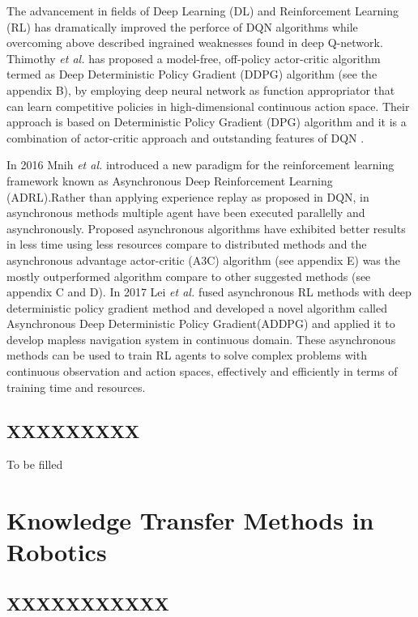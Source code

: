 \documentclass[a4paper,oneside,12pt]{report}
\begin{document}
The advancement in fields of Deep Learning (DL) and Reinforcement Learning (RL) has dramatically improved the perforce of DQN algorithms while overcoming above described ingrained weaknesses found in deep Q-network. Thimothy \textit{et al.} \cite{R06} has proposed a model-free, off-policy actor-critic algorithm termed as Deep Deterministic Policy Gradient (DDPG) algorithm (see the appendix B), by employing deep neural network as function appropriator that can learn competitive policies in high-dimensional continuous action space. Their approach is based on Deterministic Policy Gradient (DPG) algorithm \cite{R14} and it is a combination of actor-critic approach\cite{R55} and outstanding features of DQN \cite{R04} \cite{R06}. 

In 2016 Mnih \textit{et al.} introduced a new paradigm for the reinforcement learning framework known as Asynchronous Deep Reinforcement Learning (ADRL)\cite{R20}.Rather than applying experience replay as proposed in DQN, in asynchronous methods multiple agent have been executed parallelly and asynchronously. Proposed asynchronous algorithms have exhibited better results in less time using less resources compare to distributed methods \cite{R56} and the asynchronous advantage actor-critic (A3C) algorithm (see appendix E) was the mostly outperformed algorithm compare to other suggested methods (see appendix C and D). In 2017 Lei  \textit{et al.} \cite{R07} fused asynchronous RL methods with  deep deterministic policy gradient method \cite{R57} \cite{R58} \cite{R59} and developed a novel algorithm called Asynchronous Deep Deterministic Policy Gradient(ADDPG) and applied it to develop mapless navigation system in continuous domain. These asynchronous methods can be used to train RL agents to solve complex problems with continuous observation and action spaces, effectively and efficiently in terms of training time and resources.

\subsection{XXXXXXXXX}

To be filled


\section{Knowledge Transfer Methods in Robotics}

\subsection{XXXXXXXXXXX}
\end{document}
